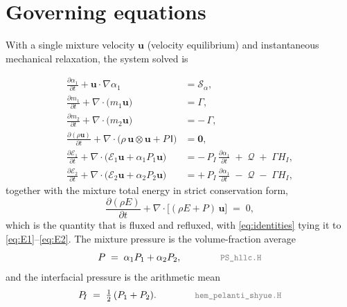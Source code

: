 \documentclass[11pt,a4paper]{article}
\newcommand{\dd}[2]{\frac{\partial #1}{\partial #2}}
\newcommand{\uvec}{\mathbf{u}}
\newcommand{\Ivec}{\mathsf{I}}
\newcommand{\code}[1]{\texttt{\small #1}}
\newcommand{\src}[1]{{\color{gray}\code{#1}}}
\begin{document}
\section{Governing equations}

With a single mixture velocity $\uvec$ (velocity equilibrium) and
instantaneous mechanical relaxation, the system solved is

\begin{align}
  \dd{\alpha_1}{t} + \uvec\!\cdot\!\nabla\alpha_1
    &= \mathcal{S}_{\alpha}, \label{eq:alpha}\\[2pt]
  \dd{m_1}{t} + \nabla\!\cdot\!\bigl(m_1\uvec\bigr)
    &= \Gamma, \label{eq:m1}\\[2pt]
  \dd{m_2}{t} + \nabla\!\cdot\!\bigl(m_2\uvec\bigr)
    &= -\,\Gamma, \label{eq:m2}\\[2pt]
  \dd{(\rho\uvec)}{t}
    + \nabla\!\cdot\!\bigl(\rho\,\uvec\!\otimes\!\uvec + P\,\Ivec\bigr)
    &= \mathbf{0}, \label{eq:mom}\\[2pt]
  \dd{\mathcal{E}_1}{t}
    + \nabla\!\cdot\!\bigl(\mathcal{E}_1\uvec + \alpha_1P_1\uvec\bigr)
    &= -\,P_{\!I}\,\dd{\alpha_1}{t}
       \;+\;\mathcal{Q}\;+\;\Gamma H_{\!I}, \label{eq:E1}\\[2pt]
  \dd{\mathcal{E}_2}{t}
    + \nabla\!\cdot\!\bigl(\mathcal{E}_2\uvec + \alpha_2P_2\uvec\bigr)
    &= +\,P_{\!I}\,\dd{\alpha_1}{t}
       \;-\;\mathcal{Q}\;-\;\Gamma H_{\!I}, \label{eq:E2}
\end{align}
%
together with the mixture total energy in strict conservation form,
\begin{equation}
  \dd{(\rho E)}{t}
    + \nabla\!\cdot\!\bigl[(\rho E + P)\,\uvec\bigr] \;=\; 0,
  \label{eq:etot}
\end{equation}
which is the quantity that is fluxed and refluxed, with
\eqref{eq:identities} tying it to \eqref{eq:E1}--\eqref{eq:E2}.  The mixture
pressure is the volume-fraction average
\begin{equation}
  P \;=\; \alpha_1P_1 + \alpha_2P_2,
  \qquad\qquad \src{PS\_hllc.H}
  \label{eq:pmix}
\end{equation}
and the interfacial pressure is the arithmetic mean
\begin{equation}
  P_{\!I} \;=\; \tfrac12\,(P_1+P_2).
  \qquad\qquad \src{hem\_pelanti\_shyue.H}
  \label{eq:pint}
\end{equation}
\end{document}
